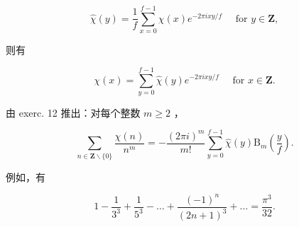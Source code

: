 \[
\hat {\chi} (y) = \frac {1}{f} \sum_ {x = 0} ^ {f - 1} \chi (x) e ^ {- 2 \pi i x y / f} \quad \text { for } y \in \mathbf {Z},
\]

则有

\[
\chi (x) = \sum_ {y = 0} ^ {f - 1} \hat {\chi} (y) e ^ {- 2 \pi i x y / f} \quad \text {   for   } x \in \mathbf {Z}.
\]

由 exerc. 12 推出：对每个整数 \(m \geqslant 2\) ，

\[
\sum_ {n \in \mathbf {Z} \backslash \{0 \}} \frac {\chi (n)}{n ^ {m}} = - \frac {(2 \pi i) ^ {m}}{m !} \sum_ {y = 0} ^ {f - 1} \hat {\chi} (y) \mathrm{B} _ {m} \left(\frac {y}{f}\right).
\]

例如，有

\[
1 - \frac {1}{3 ^ {3}} + \frac {1}{5 ^ {3}} - \dots + \frac {(- 1) ^ {n}}{(2 n + 1) ^ {3}} + \dots = \frac {\pi^ {3}}{3 2}.
\]

\setcounter{exercisegroup}{2}
